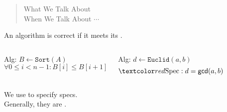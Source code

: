 
\begin{frame}{}
  \begin{quote}
    \begin{center}
    {\large
      What We Talk About \\[8pt]
      When We Talk About  $\cdots$
    }
    \end{center}
  \end{quote}
  
  \pause
  \vspace{0.30cm}
  \begin{center}
  \end{center}
\end{frame}

\begin{frame}{}
  \begin{definition}
    An algorithm is  correct if it meets its .
  \end{definition}
  
  \vspace{0.80cm}
  \begin{columns}
      \pause
      \begin{center}
        Alg: $B \gets \texttt{Sort}(A)$ \\[8pt] \pause
         \pause
        \[
          \forall 0 \le i < n-1: B[i] \le B[i + 1]
        \]
      \end{center}
      \pause
      \begin{center}
        Alg: $d \gets \texttt{Euclid}(a, b)$ \pause
        \[
          \red{\text{Spec}: d = \textsf{gcd}(a, b)}
        \]
      \end{center}
  \end{columns}
  
  \pause
  \vspace{0.50cm}
  \begin{center}
    We use  to specify specs. \\[8pt] \pause
    Generally, they are .
  \end{center}
\end{frame}

